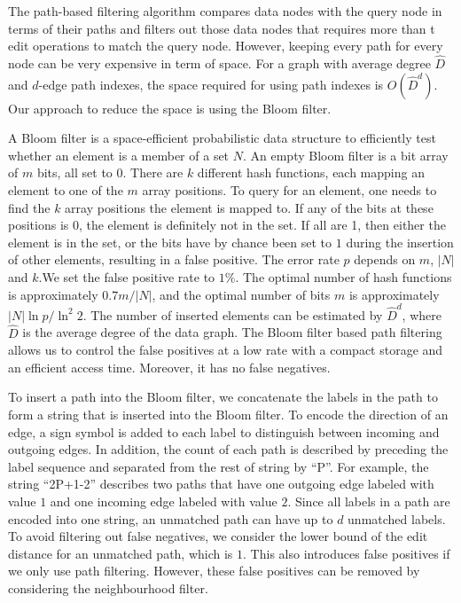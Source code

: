 \documentclass{sigmod}
\begin{document}
The path-based filtering algorithm compares data nodes with the query node in terms of their paths and filters out those data nodes that requires more than t edit operations to match the query node. However, keeping every path for every node can be very expensive in term of space. For a graph with average degree $\hat{D}$ and $d$-edge path indexes, the space required for using path indexes is $O(\hat{D}^d)$. Our approach to reduce the space is using the Bloom filter\cite{bloom1970space}.  

A Bloom filter is a space-efficient probabilistic data structure to efficiently test whether an element is a member of a set $N$. An empty Bloom filter is a bit array of $m$ bits, all set to $0$. There are $k$ different hash functions, each mapping an element to one of the $m$ array positions. To query for an element, one needs to find the $k$ array positions the element is mapped to. If any of the bits at these positions is 0, the element is definitely not in the set. If all are 1, then either the element is in the set, or the bits have by chance been set to $1$ during the insertion of other elements, resulting in a false positive. The error rate $p$ depends on $m$, $|N|$ and $k$.We set the false positive rate to  $1\%$. The optimal number of hash functions is approximately $0.7m/|N|$, and the optimal number of bits $m$ is approximately $|N|\ln{p}/\ln^2{2}$. The number of inserted elements can be estimated by $\hat{D}^d$, where $\hat{D}$ is the average degree of the data graph\cite{chazelle2004bloomier}.  The Bloom filter based path filtering allows us to control the false positives at a low rate with a compact storage and an efficient access time. Moreover, it has no false negatives. 

To insert a path into the Bloom filter, we concatenate the labels in the path to form a string that is inserted into the Bloom filter.  To encode the direction of an edge, a sign symbol is added to each label to distinguish between incoming and outgoing edges. In addition, the count of each path is described by preceding the label sequence and separated from the rest of string by ``P''. For example, the string ``2P+1-2'' describes two paths that have one outgoing edge labeled with value $1$ and one incoming edge labeled with value $2$. Since all labels in a path are encoded into one string, an unmatched path can have up to $d$ unmatched labels. To avoid filtering out false negatives, we consider the lower bound of the edit distance for an unmatched path, which is $1$. This also introduces false positives if we only use path filtering. However, these false positives can be removed by considering the neighbourhood filter.  
\end{document}
